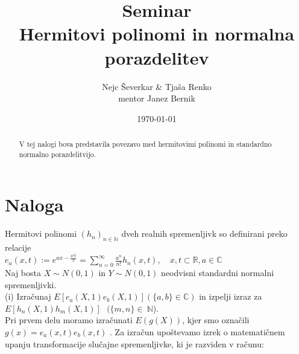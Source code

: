 \documentclass[ letterpaper, titlepage, fleqn]{article}
\begin{document}
\title{Seminar \\ Hermitovi polinomi in normalna porazdelitev}
\author{Nejc Ševerkar \& Tjaša Renko \\ mentor Janez Bernik}
\date{\today}
\maketitle

\begin{abstract}
\begin{center}
V tej nalogi bova predstavila povezavo med hermitovimi polinomi
in standardno normalno porazdelitvijo.
\end{center}
\end{abstract}

\section*{Naloga}
Hermitovi polinomi $(h_n)_{n \in \mathbb{N}}$ dveh realnih spremenljivk
so definirani preko relacije \\[10px]
$e_a(x, t) := e^{ax -\frac{a^2t}{2}} = \sum_{n=0}^{\infty} \frac{a^n}{n!} h_n(x, t), 
\quad {x, t} \subset \mathbb{R}, a \in \mathbb{C}$ \\[10px]
Naj bosta $X \sim N(0, 1)$ in $Y \sim N(0, 1)$ neodvisni standardni normalni spremenljivki. \\[10px]
(i) Izračunaj $E[e_a(X,1) e_b(X,1)] (\{a,b\} \in \mathbb{C}) $ in izpelji izraz za $ E[h_n(X,1) h_m(X,1)] \text{ } (\{m,n\}\in ~ \mathbb{N} $).\\[10px]

\noindent Pri prvem delu moramo izračunati $E\left(g\left(X\right)\right)$, kjer smo označili $g\left(x\right) = e_a\left(x, t\right) e_b\left(x, t\right)$ .
Za izračun upoštevamo izrek o matematičnem upanju transformacije slučajne spremenljivke, ki je razviden v računu:
\end{document}
